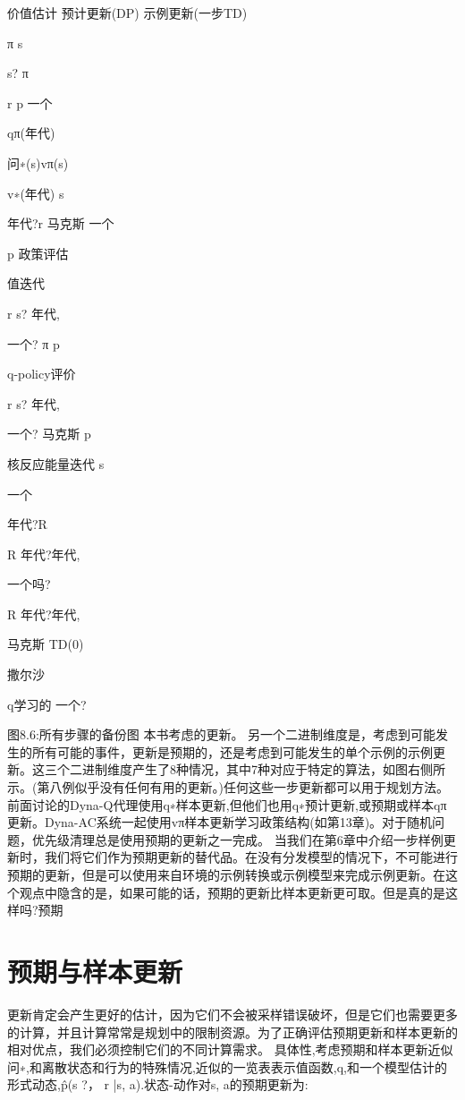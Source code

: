 价值估计
预计更新(DP)
示例更新(一步TD)

π
s


s?
π

r p
一个

qπ(年代)

问∗(s)vπ(s)

v∗(年代)
s

年代?r
马克斯
一个

p
政策评估

值迭代

r
s?
年代,

一个?
π
p

q-policy评价

r
s?
年代,

一个?
马克斯
p

核反应能量迭代
s


一个


年代?R




R
年代?年代,




一个吗?




R
年代?年代,



马克斯
TD(0)




撒尔沙




q学习的
一个?


图8.6:所有步骤的备份图
本书考虑的更新。
另一个二进制维度是，考虑到可能发生的所有可能的事件，更新是预期的，还是考虑到可能发生的单个示例的示例更新。这三个二进制维度产生了8种情况，其中7种对应于特定的算法，如图右侧所示。(第八例似乎没有任何有用的更新。)任何这些一步更新都可以用于规划方法。前面讨论的Dyna-Q代理使用q∗样本更新,但他们也用q∗预计更新,或预期或样本qπ更新。Dyna-AC系统一起使用vπ样本更新学习政策结构(如第13章)。对于随机问题，优先级清理总是使用预期的更新之一完成。
当我们在第6章中介绍一步样例更新时，我们将它们作为预期更新的替代品。在没有分发模型的情况下，不可能进行预期的更新，但是可以使用来自环境的示例转换或示例模型来完成示例更新。在这个观点中隐含的是，如果可能的话，预期的更新比样本更新更可取。但是真的是这样吗?预期

\section{预期与样本更新}



更新肯定会产生更好的估计，因为它们不会被采样错误破坏，但是它们也需要更多的计算，并且计算常常是规划中的限制资源。为了正确评估预期更新和样本更新的相对优点，我们必须控制它们的不同计算需求。
具体性,考虑预期和样本更新近似问∗,和离散状态和行为的特殊情况,近似的一览表表示值函数,q,和一个模型估计的形式动态,p̂(s ?， r |s, a).状态-动作对s, a的预期更新为:

